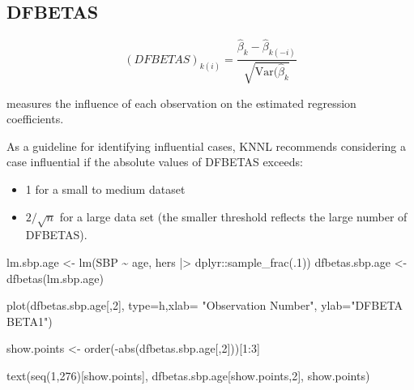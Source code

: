 \documentclass[
  letterpaper,
  DIV=11,
  numbers=noendperiod]{scrreport}
\newenvironment{Shaded}{\begin{snugshade}}{\end{snugshade}}
\newcommand{\AttributeTok}[1]{\textcolor[rgb]{0.40,0.45,0.13}{#1}}
\newcommand{\DecValTok}[1]{\textcolor[rgb]{0.68,0.00,0.00}{#1}}
\newcommand{\FunctionTok}[1]{\textcolor[rgb]{0.28,0.35,0.67}{#1}}
\newcommand{\NormalTok}[1]{\textcolor[rgb]{0.00,0.23,0.31}{#1}}
\newcommand{\OtherTok}[1]{\textcolor[rgb]{0.00,0.23,0.31}{#1}}
\newcommand{\SpecialCharTok}[1]{\textcolor[rgb]{0.37,0.37,0.37}{#1}}
\newcommand{\StringTok}[1]{\textcolor[rgb]{0.13,0.47,0.30}{#1}}
\providecommand{\tightlist}{%
  \setlength{\itemsep}{0pt}\setlength{\parskip}{0pt}}\usepackage{longtable,booktabs,array}
\begin{document}
\hypertarget{dfbetas}{%
\subsection{DFBETAS}\label{dfbetas}}

\[(DFBETAS)_{k(i)} = \frac{\hat \beta_k - \hat \beta_{k(-i)}}{\sqrt{\text{Var}(\hat \beta_k}}\]

measures the influence of each observation on the estimated regression
coefficients.

As a guideline for identifying influential cases, KNNL recommends
considering a case influential if the absolute values of DFBETAS
exceeds:

\begin{itemize}
\tightlist
\item
  1 for a small to medium dataset
\item
  \(2/\sqrt{n}\) for a large data set (the smaller threshold reflects
  the large number of DFBETAS).
\end{itemize}

\begin{Shaded}
\begin{Highlighting}[]
\NormalTok{lm.sbp.age }\OtherTok{\textless{}{-}} \FunctionTok{lm}\NormalTok{(SBP }\SpecialCharTok{\textasciitilde{}}\NormalTok{ age, hers }\SpecialCharTok{|\textgreater{}}\NormalTok{ dplyr}\SpecialCharTok{::}\FunctionTok{sample\_frac}\NormalTok{(.}\DecValTok{1}\NormalTok{))}
\NormalTok{dfbetas.sbp.age }\OtherTok{\textless{}{-}} \FunctionTok{dfbetas}\NormalTok{(lm.sbp.age)}

\FunctionTok{plot}\NormalTok{(dfbetas.sbp.age[,}\DecValTok{2}\NormalTok{], }\AttributeTok{type=}\StringTok{\textquotesingle{}h\textquotesingle{}}\NormalTok{,}\AttributeTok{xlab=} \StringTok{"Observation Number"}\NormalTok{, }\AttributeTok{ylab=}\StringTok{"DFBETA BETA1"}\NormalTok{)}

\NormalTok{show.points }\OtherTok{\textless{}{-}} \FunctionTok{order}\NormalTok{(}\SpecialCharTok{{-}}\FunctionTok{abs}\NormalTok{(dfbetas.sbp.age[,}\DecValTok{2}\NormalTok{]))[}\DecValTok{1}\SpecialCharTok{:}\DecValTok{3}\NormalTok{]}

\FunctionTok{text}\NormalTok{(}\FunctionTok{seq}\NormalTok{(}\DecValTok{1}\NormalTok{,}\DecValTok{276}\NormalTok{)[show.points],}
\NormalTok{dfbetas.sbp.age[show.points,}\DecValTok{2}\NormalTok{], show.points)}
\end{Highlighting}
\end{Shaded}
\end{document}

